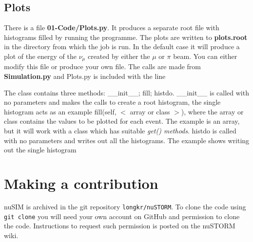   
 \subsection{Plots}
 There is a file {\bf 01-Code/Plots.py}. It produces a separate root file with histograms filled by running the programme. The
 plots are written to {\bf plots.root} in the directory from which the job is run. In the default case it will produce a plot
 of the energy of the $\nu_{\mu}$ created by either the $\mu$ or $\pi$ beam. You can either modify this file or produce your own file. The calls are made from {\bf Simulation.py} and Plots.py is included with the line 
 \hfill\newline
 
 \noindent The class contains three methods: \_\_init\_\_; fill; histdo.\newline
 \_\_init\_\_ is called with no parameters and makes the calls to create a root histogram, the single histogram acts as
 an example\newline
fill(self, $<$ array or class $>$), where the array or class contains the values to be plotted for each event. The example is an array, but it will work  with a class which has suitable {\it get() methods}.\newline
histdo is called with no parameters and writes out all the histograms. The example shows writing out the single histogram
 
 
\section*{Making a contribution}
nuSIM is archived in the git repository \verb+longkr/nuSTORM+.
To clone the code using
\verb+git clone+ you will need your own account on GitHub and
permission to clone the code. 
Instructions to request such permission is posted on the nuSTORM
wiki.
